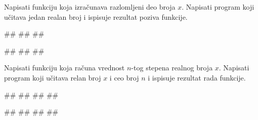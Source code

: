 \begin{Exercise}[label=p1.4_03] 
Napisati funkciju  koja
izračunava razlomljeni deo broja $x$. Napisati program koji učitava
jedan realan broj i ispisuje rezultat poziva funkcije.
 
\begin{miditest}
\begin{upotreba}{1}
#\naslovInt#
##
##
\end{upotreba}
\end{miditest}
\begin{miditest}
\begin{upotreba}{2}
#\naslovInt#
##
##
\end{upotreba}
\end{miditest}
\end{Exercise}
\begin{Answer}[ref=p1.4_03]
\end{Answer}

\begin{Exercise}[label=v1.4_02] 
Napisati funkciju  koja računa
vrednost $n$-tog stepena realnog broja $x$. Napisati program koji
učitava relan broj $x$ i ceo broj $n$ i ispisuje rezultat rada
funkcije.

\begin{miditest}
\begin{upotreba}{1}
#\naslovInt#
##
##
##
\end{upotreba}
\end{miditest}
\begin{miditest}
\begin{upotreba}{2}
#\naslovInt#
##
##
##
\end{upotreba}
\end{miditest}

\end{Exercise}
\begin{Answer}[ref=v1.4_02]
\end{Answer}

